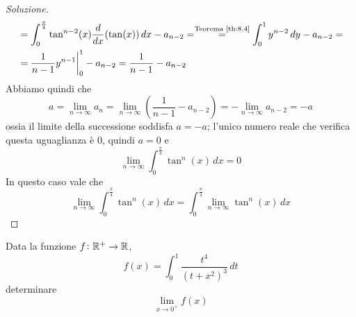 \begin{proof}[Soluzione]
\[\begin{split}
        & = \int_0^{\frac{\pi}{4}}\tan^{n-2}(x) \frac{d}{dx}(\tan(x))\, dx - a_{n-2} = \overset{\text{Teorema \ref{th:8.4}}}{=} \int_0^1 y^{n-2}\, dy - a_{n-2} = \\
        & = \frac{1}{n-1} y^{n-1}\bigg|_0^1 - a_{n-2} = \frac{1}{n-1}-a_{n-2}
    \end{split}
    \]
    Abbiamo quindi che
    \[
    a = \lim_{n\to \infty} a_n = \lim_{n\to\infty}\left( \frac{1}{n-1} - a_{n-2}\right) = -\lim_{n\to\infty}a_{n-2} = -a
    \]
    ossia il limite della successione soddisfa $a=-a$; l'unico numero reale che verifica questa uguaglianza è $0$, quindi $a=0$ e
    \[
    \lim_{n\to\infty} \int_0^{\frac{\pi}{4}} \tan^n(x)\, dx = 0
    \]
    In questo caso vale che
    \[
    \lim_{n\to\infty} \int_0^{\frac{\pi}{4}} \tan^n(x)\, dx = \int_0^{\frac{\pi}{4}}\lim_{n\to\infty} \tan^n(x)\, dx
    \]
\end{proof}
\begin{exercise}
    \label{ex:9.6}
    Data la funzione $f\colon\amsbb{R}^+\to \amsbb{R}$,
    \[
    f(x) = \int_0^1 \frac{t^4}{(t+x^2)^3}\, dt
    \]
    determinare
    \[
    \lim_{x\to 0^+} f(x)
    \]
\end{exercise}
